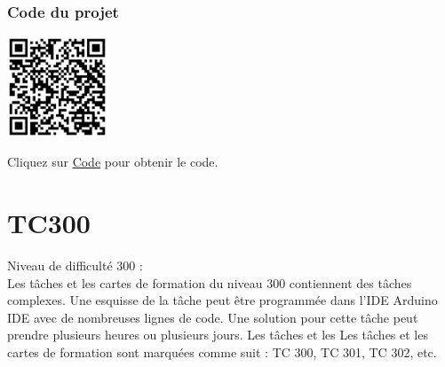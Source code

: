 \documentclass[a4paper,12pt]{report}
\begin{document}
\subsubsection{Code du projet}

\begin{minipage}{0.5\textwidth}
    \includegraphics[height=3cm]{Code TC211.png}
\end{minipage}%
\begin{minipage}{0.5\textwidth}
    Cliquez sur \href{https://github.com/DexterTaha/Controllino-PLC-Sample/blob/main/TC200/TC211_Escalator/TC211_Escalator.ino}{Code} pour obtenir le code.
\end{minipage}

\newpage
\section{TC300}

Niveau de difficulté 300 :\\

Les tâches et les cartes de formation du niveau 300 contiennent des tâches complexes. Une esquisse de la tâche peut être programmée dans l'IDE Arduino IDE avec de nombreuses lignes de code. Une solution pour cette tâche peut prendre plusieurs heures ou plusieurs jours. Les tâches et les Les tâches et les cartes de formation sont marquées comme suit : TC 300, TC 301, TC 302, etc.

\newpage
\end{document}
